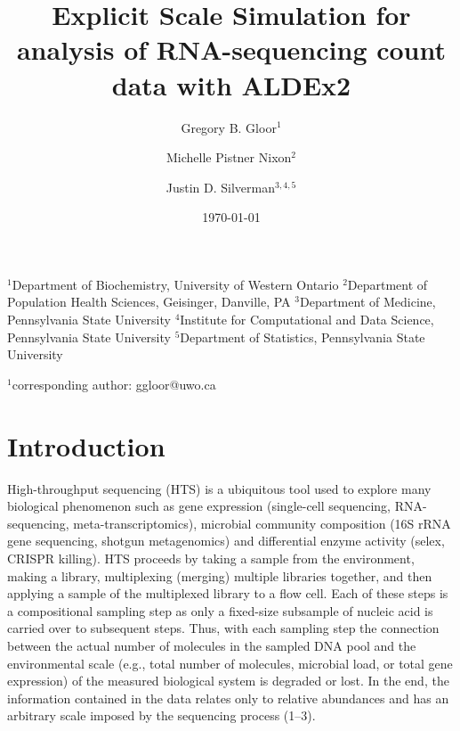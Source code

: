 \documentclass[
]{article}
\title{Explicit Scale Simulation for analysis of RNA-sequencing count
data with ALDEx2}
\author{Gregory B. Gloor$^1$ \and Michelle Pistner Nixon$^2$ \and Justin D. Silverman$^{3,4,5}$}
\date{\today}
\begin{document}
\maketitle

$^1$Department of Biochemistry, University of Western Ontario
$^2$Department of Population Health Sciences, Geisinger, Danville, PA
$^3$Department of Medicine, Pennsylvania State University
$^4$Institute for Computational and Data Science, Pennsylvania State University
$^5$Department of Statistics, Pennsylvania State University

$^1$corresponding author: ggloor@uwo.ca

\section{Introduction}\label{introduction}

\doublespacing \singlespacing 
\linenumbers

High-throughput sequencing (HTS) is a ubiquitous tool used to explore
many biological phenomenon such as gene expression (single-cell
sequencing, RNA-sequencing, meta-transcriptomics), microbial community
composition (16S rRNA gene sequencing, shotgun metagenomics) and
differential enzyme activity (selex, CRISPR killing). HTS proceeds by
taking a sample from the environment, making a library, multiplexing
(merging) multiple libraries together, and then applying a sample of the
multiplexed library to a flow cell. Each of these steps is a
compositional sampling step as only a fixed-size subsample of nucleic
acid is carried over to subsequent steps. Thus, with each sampling step
the connection between the actual number of molecules in the sampled DNA
pool and the environmental scale (e.g., total number of molecules,
microbial load, or total gene expression) of the measured biological
system is degraded or lost. In the end, the information contained in the
data relates only to relative abundances and has an arbitrary scale
imposed by the sequencing process (1--3).
\end{document}

